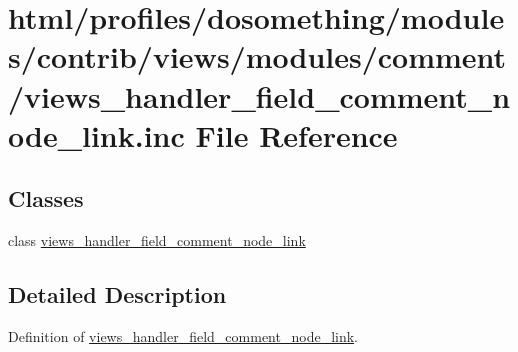\hypertarget{views__handler__field__comment__node__link_8inc}{
\section{html/profiles/dosomething/modules/contrib/views/modules/comment/views\_\-handler\_\-field\_\-comment\_\-node\_\-link.inc File Reference}
\label{views__handler__field__comment__node__link_8inc}
}
\subsection*{Classes}
\begin{DoxyCompactItemize}
\item 
class \hyperlink{classviews__handler__field__comment__node__link}{views\_\-handler\_\-field\_\-comment\_\-node\_\-link}
\end{DoxyCompactItemize}


\subsection{Detailed Description}
Definition of \hyperlink{classviews__handler__field__comment__node__link}{views\_\-handler\_\-field\_\-comment\_\-node\_\-link}. 